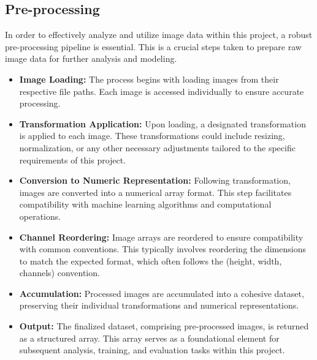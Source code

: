 \documentclass[conference]{IEEEtran}
\begin{document}
\subsection{\textbf{Pre-processing}}
In order to effectively analyze and utilize image data within this project, a robust pre-processing pipeline is essential. This is a crucial steps taken to prepare raw image data for further analysis and modeling. \\

\begin{itemize}
    \item[] \textbf{Image Loading:} The process begins with loading images from their respective file paths. Each image is accessed individually to ensure accurate processing. 
    \item[] \textbf{Transformation Application:} Upon loading, a designated transformation is applied to each image. These transformations could include resizing, normalization, or any other necessary adjustments tailored to the specific requirements of this project. 
    \item[] \textbf{Conversion to Numeric Representation:} Following transformation, images are converted into a numerical array format. This step facilitates compatibility with machine learning algorithms and computational operations. 
    \item[] \textbf{Channel Reordering:} Image arrays are reordered to ensure compatibility with common conventions. This typically involves reordering the dimensions to match the expected format, which often follows the (height, width, channels) convention. 
    \item[] \textbf{Accumulation:} Processed images are accumulated into a cohesive dataset, preserving their individual transformations and numerical representations. 
    \item[] \textbf{Output:} The finalized dataset, comprising pre-processed images, is returned as a structured array. This array serves as a foundational element for subsequent analysis, training, and evaluation tasks within this project. 
\end{itemize}
\end{document}
